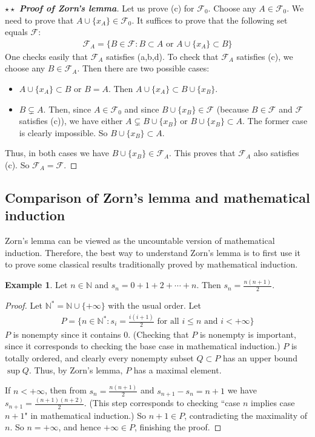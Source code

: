\documentclass[12pt,b5paper,notitlepage]{article}
\theoremstyle{definition}
\newtheorem{eg}[df]{Example}
\theoremstyle{plain}
\newcommand{\mc}{\mathcal}
\newcommand{\Nbb}{\mathbb N}
\numberwithin{equation}{section}
\begin{document}
\begin{proof}[$\star\star$ \textbf{Proof of Zorn's lemma}]
Let us prove (c) for $\mc F_0$. Choose any $A\in\mc F_0$. We need to prove that $A\cup\{x_A\}\in\mc F_0$. It suffices to prove that the following set equals $\mc F$:
\begin{align*}
\mc F_A=\{B\in\mc F:B\subset A\text{ or }A\cup\{x_A\}\subset B\}
\end{align*}
One checks easily that $\mc F_A$ satisfies (a,b,d). To check that $\mc F_A$ satisfies (c), we choose any $B\in\mc F_A$. Then there are two possible cases:
\begin{itemize}
\item $A\cup\{x_A\}\subset B$ or $B=A$. Then $A\cup\{x_A\}\subset B\cup\{x_B\}$. 
\item $B\subsetneq A$. Then, since $A\in\mc F_0$ and since $B\cup\{x_B\}\in\mc F$ (because $B\in\mc F$ and $\mc F$ satisfies (c)), we have either $A\subsetneq B\cup\{x_B\}$ or $B\cup\{x_B\}\subset A$. The former case is clearly impossible. So $B\cup\{x_B\}\subset A$.
\end{itemize}
Thus, in both cases we have $B\cup\{x_B\}\in\mc F_A$. This proves that $\mc F_A$ also satisfies (c). So $\mc F_A=\mc F$.
\end{proof}




\subsection{Comparison of Zorn's lemma and mathematical induction}



Zorn's lemma can be viewed as the uncountable version of mathematical induction. Therefore, the best way to understand Zorn's lemma is to first use it to prove some classical results traditionally proved by  mathematical induction.




\begin{eg}
Let $n\in\Nbb$ and $s_n=0+1+2+\cdots+n$. Then $s_n=\frac {n(n+1)}2$.
\end{eg}


\begin{proof}
Let $\Nbb^*=\Nbb\cup\{+\infty\}$ with the usual order. Let
\begin{align*}
P=\Big\{n\in\Nbb^*:s_i=\frac{i(i+1)}2\text{ for all }i\leq n\text{ and }i<+\infty \Big\}
\end{align*}
$P$ is nonempty since it contains $0$. (Checking that $P$ is nonempty is important, since it corresponds to checking the base case in mathematical induction.) $P$ is totally ordered, and clearly every nonempty subset  $Q\subset P$ has an upper bound $\sup Q$. Thus, by Zorn's lemma, $P$ has a maximal element. 

If $n<+\infty$, then from $s_n=\frac{n(n+1)}2$ and $s_{n+1}-s_n=n+1$ we have $s_{n+1}=\frac{(n+1)(n+2)}2$. (This step corresponds to checking ``case $n$ implies case $n+1$" in mathematical induction.) So $n+1\in P$, contradicting the maximality of $n$. So $n=+\infty$, and hence $+\infty\in P$, finishing the proof.
\end{proof}
\end{document}
